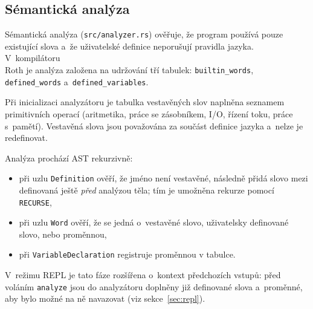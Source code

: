 \subsection{Sémantická analýza}
\label{sec:analyzer}

Sémantická analýza (\texttt{src/analyzer.rs}) ověřuje, že program používá pouze
existující slova a~že uživatelské definice neporušují pravidla jazyka.
V~kompilátoru \\Roth{} je analýza založena na udržování tří tabulek:
\texttt{builtin\_words}, \texttt{defined\_words} a~\texttt{defined\_variables}.

Při inicializaci analyzátoru je tabulka vestavěných slov naplněna seznamem
primitivních operací (aritmetika, práce se zásobníkem, I/O, řízení toku,
práce s~pamětí). Vestavěná slova jsou považována za součást definice jazyka a~nelze
je redefinovat.

Analýza prochází AST rekurzivně:
\begin{itemize}
	\item při uzlu \texttt{Definition} ověří, že jméno není vestavěné, následně
	      přidá slovo mezi definovaná ještě \emph{před} analýzou těla;
	      tím je umožněna rekurze pomocí \texttt{RECURSE},
	\item při uzlu \texttt{Word} ověří, že se jedná o~vestavěné slovo, uživatelsky
	      definované slovo, nebo proměnnou,
	\item při \texttt{VariableDeclaration} registruje proměnnou v tabulce.
\end{itemize}

V~režimu REPL je tato fáze rozšířena o~kontext předchozích vstupů: před voláním
\texttt{analyze} jsou do analyzátoru doplněny již definované slova a~proměnné,
aby bylo možné na ně navazovat (viz sekce~\ref{sec:repl}).
